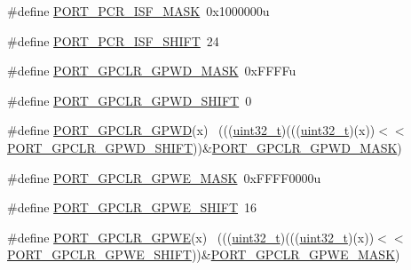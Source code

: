 \begin{DoxyCompactItemize}
\item 
\#define \hyperlink{group___p_o_r_t___register___masks_ga154d9308c2ab5b6a78ab04d9f3b08879}{P\+O\+R\+T\+\_\+\+P\+C\+R\+\_\+\+I\+S\+F\+\_\+\+M\+A\+SK}~0x1000000u
\item 
\#define \hyperlink{group___p_o_r_t___register___masks_ga5fbf95753704fb1d71da88299c11105e}{P\+O\+R\+T\+\_\+\+P\+C\+R\+\_\+\+I\+S\+F\+\_\+\+S\+H\+I\+FT}~24
\item 
\#define \hyperlink{group___p_o_r_t___register___masks_gaa7e4a890e9d09d85279889ce3ecb0044}{P\+O\+R\+T\+\_\+\+G\+P\+C\+L\+R\+\_\+\+G\+P\+W\+D\+\_\+\+M\+A\+SK}~0x\+F\+F\+F\+Fu
\item 
\#define \hyperlink{group___p_o_r_t___register___masks_gaafacaac0aa215f596b947609857d6491}{P\+O\+R\+T\+\_\+\+G\+P\+C\+L\+R\+\_\+\+G\+P\+W\+D\+\_\+\+S\+H\+I\+FT}~0
\item 
\#define \hyperlink{group___p_o_r_t___register___masks_gab9daa192b3e0c7d1bf44689b960c5a4f}{P\+O\+R\+T\+\_\+\+G\+P\+C\+L\+R\+\_\+\+G\+P\+WD}(x)                                          ~(((\hyperlink{_p_e___types_8h_a33594304e786b158f3fb30289278f5af}{uint32\+\_\+t})(((\hyperlink{_p_e___types_8h_a33594304e786b158f3fb30289278f5af}{uint32\+\_\+t})(x))$<$$<$\hyperlink{group___p_o_r_t___register___masks_gaafacaac0aa215f596b947609857d6491}{P\+O\+R\+T\+\_\+\+G\+P\+C\+L\+R\+\_\+\+G\+P\+W\+D\+\_\+\+S\+H\+I\+FT}))\&\hyperlink{group___p_o_r_t___register___masks_gaa7e4a890e9d09d85279889ce3ecb0044}{P\+O\+R\+T\+\_\+\+G\+P\+C\+L\+R\+\_\+\+G\+P\+W\+D\+\_\+\+M\+A\+SK})
\item 
\#define \hyperlink{group___p_o_r_t___register___masks_ga49c4160370859546837be80a2eed1365}{P\+O\+R\+T\+\_\+\+G\+P\+C\+L\+R\+\_\+\+G\+P\+W\+E\+\_\+\+M\+A\+SK}~0x\+F\+F\+F\+F0000u
\item 
\#define \hyperlink{group___p_o_r_t___register___masks_ga340d6aadd9516b3cac26187b014ce9d3}{P\+O\+R\+T\+\_\+\+G\+P\+C\+L\+R\+\_\+\+G\+P\+W\+E\+\_\+\+S\+H\+I\+FT}~16
\item 
\#define \hyperlink{group___p_o_r_t___register___masks_ga82584460ead116af92e0d8d2ce15a88e}{P\+O\+R\+T\+\_\+\+G\+P\+C\+L\+R\+\_\+\+G\+P\+WE}(x)                                          ~(((\hyperlink{_p_e___types_8h_a33594304e786b158f3fb30289278f5af}{uint32\+\_\+t})(((\hyperlink{_p_e___types_8h_a33594304e786b158f3fb30289278f5af}{uint32\+\_\+t})(x))$<$$<$\hyperlink{group___p_o_r_t___register___masks_ga340d6aadd9516b3cac26187b014ce9d3}{P\+O\+R\+T\+\_\+\+G\+P\+C\+L\+R\+\_\+\+G\+P\+W\+E\+\_\+\+S\+H\+I\+FT}))\&\hyperlink{group___p_o_r_t___register___masks_ga49c4160370859546837be80a2eed1365}{P\+O\+R\+T\+\_\+\+G\+P\+C\+L\+R\+\_\+\+G\+P\+W\+E\+\_\+\+M\+A\+SK})

\end{DoxyCompactItemize}
